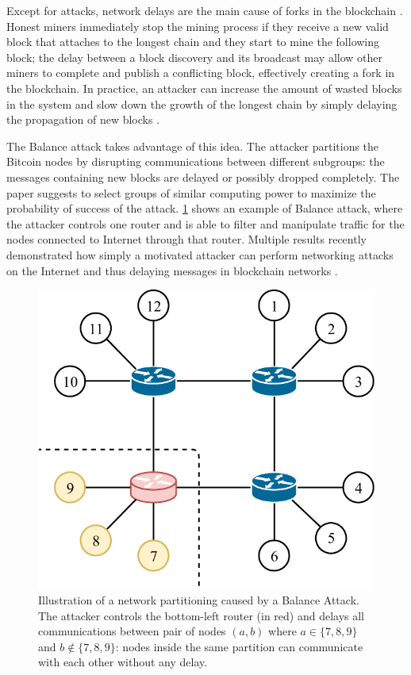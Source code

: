 Except for attacks, network delays are the main cause of forks in the blockchain \cite{information_propagation_2013}.
Honest miners immediately stop the mining process if they receive a new valid block that attaches to the longest chain and they start to mine the following block;
the delay between a block discovery and its broadcast may allow other miners to complete and publish a conflicting block, effectively creating a fork in the blockchain.
In practice, an attacker can increase the amount of wasted blocks in the system and slow down the growth of the longest chain by simply delaying the propagation of new blocks \cite{balance_attack_2017}.

\bigskip
The Balance attack takes advantage of this idea.
The attacker partitions the Bitcoin nodes by disrupting communications between different subgroups:
the messages containing new blocks are delayed or possibly dropped completely.
The paper suggests to select groups of similar computing power to maximize the probability of success of the attack.
\cref{fig:balance} shows an example of Balance attack, where the attacker controls one router and is able to filter and manipulate traffic for the nodes connected to Internet through that router.
Multiple results recently demonstrated how simply a motivated attacker can perform networking attacks on the Internet and thus delaying messages in blockchain networks \cite{bgp_hijacking_secureworks, eclipse_attack_2015, hijacking_bitcoin_2017}.

\begin{figure}[h]
	\centering
	\vspace*{0.25cm}
	\includegraphics[scale=0.8]{figures/balance}
	\vspace*{0.25cm}
	\caption[Illustration of a network partitioning caused by a Balance Attack]{
		Illustration of a network partitioning caused by a Balance Attack.
		The attacker controls the bottom-left router (in red) and delays all communications between pair of nodes $(a, b)$ where $a \in \{7,8,9\}$ and $b \not \in \{7, 8, 9\}$:
		nodes inside the same partition can communicate with each other without any delay.
	}
	\label{fig:balance}
\end{figure}

